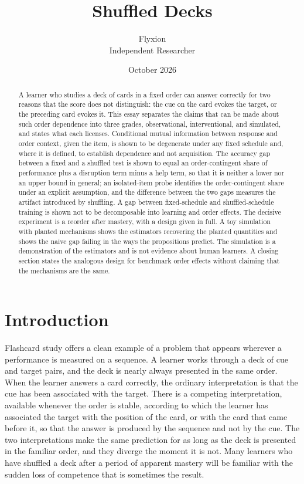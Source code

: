 \documentclass[11pt]{article}
\title{Shuffled Decks}
\author{Flyxion\\Independent Researcher}
\date{October 2026}
\theoremstyle{remark}
\begin{document}
\maketitle

\begin{abstract}
A learner who studies a deck of cards in a fixed order can answer correctly for two reasons that the score does not distinguish: the cue on the card evokes the target, or the preceding card evokes it. This essay separates the claims that can be made about such order dependence into three grades, observational, interventional, and simulated, and states what each licenses. Conditional mutual information between response and order context, given the item, is shown to be degenerate under any fixed schedule and, where it is defined, to establish dependence and not acquisition. The accuracy gap between a fixed and a shuffled test is shown to equal an order-contingent share of performance plus a disruption term minus a help term, so that it is neither a lower nor an upper bound in general; an isolated-item probe identifies the order-contingent share under an explicit assumption, and the difference between the two gaps measures the artifact introduced by shuffling. A gap between fixed-schedule and shuffled-schedule training is shown not to be decomposable into learning and order effects. The decisive experiment is a reorder after mastery, with a design given in full. A toy simulation with planted mechanisms shows the estimators recovering the planted quantities and shows the naive gap failing in the ways the propositions predict. The simulation is a demonstration of the estimators and is not evidence about human learners. A closing section states the analogous design for benchmark order effects without claiming that the mechanisms are the same.
\end{abstract}

\section{Introduction}

Flashcard study offers a clean example of a problem that appears wherever a performance is measured on a sequence. A learner works through a deck of cue and target pairs, and the deck is nearly always presented in the same order. When the learner answers a card correctly, the ordinary interpretation is that the cue has been associated with the target. There is a competing interpretation, available whenever the order is stable, according to which the learner has associated the target with the position of the card, or with the card that came before it, so that the answer is produced by the sequence and not by the cue. The two interpretations make the same prediction for as long as the deck is presented in the familiar order, and they diverge the moment it is not. Many learners who have shuffled a deck after a period of apparent mastery will be familiar with the sudden loss of competence that is sometimes the result.
\end{document}
